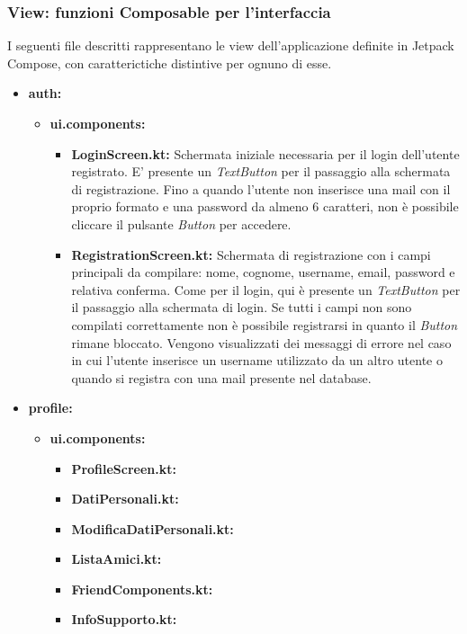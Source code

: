 \documentclass{article}
\begin{document}
\subsubsection{View: funzioni Composable per l'interfaccia}
I seguenti file descritti rappresentano le view dell'applicazione definite in Jetpack Compose, con caratterictiche distintive per ognuno di esse.
\begin{itemize}
  \item \textbf{auth:}
  \begin{itemize}
    \item \textbf{ui.components:}
    \begin{itemize}
      \item \textbf{LoginScreen.kt:} Schermata iniziale necessaria per il login dell'utente registrato. E' presente un \textit{TextButton} per il passaggio alla schermata di registrazione. Fino a quando l'utente non inserisce una mail con il proprio formato e una password da almeno 6 caratteri, non è possibile cliccare il pulsante \textit{Button} per accedere.
      \item \textbf{RegistrationScreen.kt:} Schermata di registrazione con i campi principali da compilare: nome, cognome, username, email, password e relativa conferma. Come per il login, qui è presente un \textit{TextButton} per il passaggio alla schermata di login. Se tutti i campi non sono compilati correttamente non è possibile registrarsi in quanto il \textit{Button} rimane bloccato. 
      Vengono visualizzati dei messaggi di errore nel caso in cui l'utente inserisce un username utilizzato da un altro utente o quando si registra con una mail presente nel database.
    \end{itemize}
  \end{itemize}
  \item \textbf{profile:}
  \begin{itemize}
    \item \textbf{ui.components:}
    \begin{itemize}
      \item \textbf{ProfileScreen.kt:}
      \item \textbf{DatiPersonali.kt:}
      \item \textbf{ModificaDatiPersonali.kt:}
      \item \textbf{ListaAmici.kt:}
      \item \textbf{FriendComponents.kt:}
      \item \textbf{InfoSupporto.kt:}
    \end{itemize}

\end{itemize}
\end{itemize}
\end{document}
